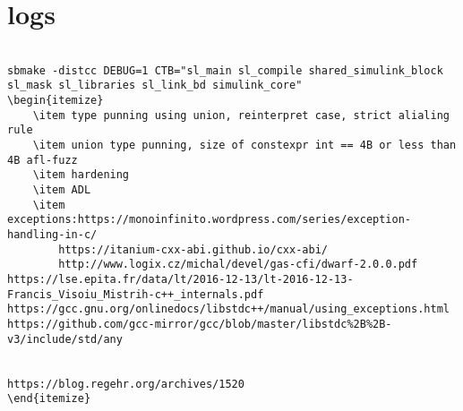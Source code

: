 \section{logs} 
\begin{verbatim}

sbmake -distcc DEBUG=1 CTB="sl_main sl_compile shared_simulink_block sl_mask sl_libraries sl_link_bd simulink_core"
\begin{itemize}
    \item type punning using union, reinterpret case, strict alialing rule
    \item union type punning, size of constexpr int == 4B or less than 4B afl-fuzz
    \item hardening
    \item ADL
    \item exceptions:https://monoinfinito.wordpress.com/series/exception-handling-in-c/  
        https://itanium-cxx-abi.github.io/cxx-abi/ 
        http://www.logix.cz/michal/devel/gas-cfi/dwarf-2.0.0.pdf
https://lse.epita.fr/data/lt/2016-12-13/lt-2016-12-13-Francis_Visoiu_Mistrih-c++_internals.pdf
https://gcc.gnu.org/onlinedocs/libstdc++/manual/using_exceptions.html
https://github.com/gcc-mirror/gcc/blob/master/libstdc%2B%2B-v3/include/std/any


https://blog.regehr.org/archives/1520
\end{itemize}
\end{verbatim}

